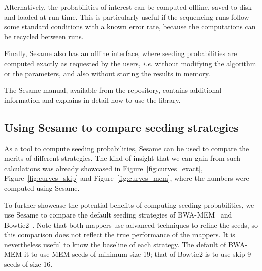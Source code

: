 \documentclass{article}
\begin{document}
Alternatively, the probabilities of interest can be computed offline,
saved to disk and loaded at run time. This is particularly useful if the
sequencing runs follow some standard conditions with a known error rate,
because the computations can be recycled between runs.

Finally, Sesame also has an offline interface, where seeding probabilities
are computed exactly as requested by the users, \textit{i.e.} without
modifying the algorithm or the parameters, and also without storing the
results in memory.

The Sesame manual, available from the repository, contains additional
information and explains in detail how to use the library.


\subsection{Using Sesame to compare seeding strategies}

As a tool to compute seeding probabilities, Sesame can be used to compare
the merits of different strategies. The kind of insight that we can gain
from such calculations was already showcased in
Figure~\ref{fig:curves_exact}, Figure~\ref{fig:curves_skip} and
Figure~\ref{fig:curves_mem}, where the numbers were computed using Sesame.

To further showcase the potential benefits of computing seeding
probabilities, we use Sesame to compare the default seeding strategies of
BWA-MEM~\cite{li2013aligning} and Bowtie2~\cite{pmid22388286}. Note that
both mappers use advanced techniques to refine the seeds, so this
comparison does not reflect the true performance of the mappers. It is
nevertheless useful to know the baseline of each strategy. The default of
BWA-MEM it to use MEM seeds of minimum size 19; that of Bowtie2 is to use
skip-9 seeds of size 16.
\end{document}
